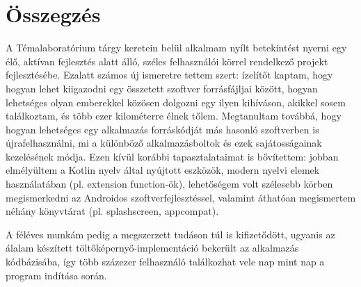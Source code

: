 \chapter{Összegzés}

A Témalaboratórium tárgy keretein belül alkalmam nyílt betekintést nyerni egy élő,
aktívan fejlesztés alatt álló, széles felhasználói körrel rendelkező projekt fejlesztésébe.
Ezalatt számos új ismeretre tettem szert: ízelítőt kaptam, hogy hogyan lehet kiigazodni egy
összetett szoftver forrásfájljai között, hogyan lehetséges olyan emberekkel közösen dolgozni
egy ilyen kihíváson, akikkel sosem találkoztam, és több ezer kilométerre élnek tőlem.
Megtanultam továbbá, hogy hogyan lehetséges egy alkalmazás forráskódját más hasonló
szoftverben is újrafelhasználni, mi a különböző alkalmazásboltok és ezek sajátosságainak
kezelésének módja. Ezen kívül korábbi tapasztalataimat is bővítettem: jobban elmélyültem
a Kotlin nyelv által nyújtott eszközök, modern nyelvi elemek használatában
(pl. extension function-ök), lehetőségem volt szélesebb körben megismerkedni az Androidos
szoftverfejlesztéssel, valamint áthatóan megismertem néhány könyvtárat
(pl. \gls{splashscreen}, \gls{appcompat}).

A féléves munkám pedig a megszerzett tudáson túl is kifizetődött, ugyanis az álalam
készített töltőképernyő-implementáció bekerült az alkalmazás kódbázisába, így több
százezer felhasználó találkozhat vele nap mint nap a program indítása során.

